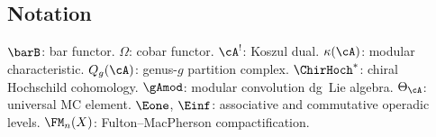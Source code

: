 \subsection*{Notation}

$\barB$: bar functor. $\Omega$: cobar functor.
$\cA^!$: Koszul dual.
$\kappa(\cA)$: modular characteristic.
$Q_g(\cA)$: genus-$g$ partition complex.
$\ChirHoch^*$: chiral Hochschild cohomology.
$\gAmod$: modular convolution dg~Lie algebra.
$\Theta_\cA$: universal MC element.
$\Eone$, $\Einf$: associative and commutative operadic levels.
$\FM_n(X)$: Fulton--MacPherson compactification.

